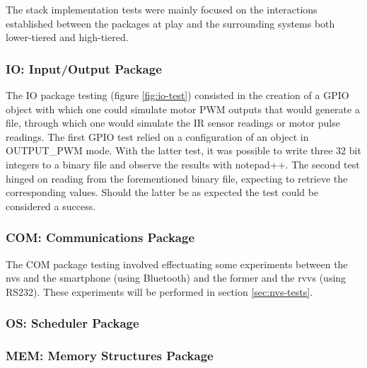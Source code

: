 %
The stack implementation tests were mainly focused on the interactions established between the packages at play and the surrounding systems both lower-tiered and high-tiered.
%
\subsubsection{IO: Input/Output Package}
%
The IO package testing (figure \ref{fig:io-test}) consisted in the creation of a GPIO object with which one could simulate motor PWM outputs that would generate a file, through which one would simulate the IR sensor readings or motor pulse readings. The first GPIO test relied on a configuration of an object in OUTPUT\_PWM mode. With the latter test, it was possible to write three 32 bit integers to a binary file and observe the results with notepad++.
The second test hinged on reading from the forementioned binary file, expecting to retrieve the corresponding values. Should the latter be as expected the test could be considered a success.
%
\subsubsection{COM: Communications Package}
%
The COM package testing involved effectuating some experiments between the \gls{nvs} and the smartphone (using Bluetooth) and the former and the \gls{rvvs} (using RS232). These experiments will be performed in section \ref{sec:nvs-tests}.
%
\subsubsection{OS: Scheduler Package}
%
\subsubsection{MEM: Memory Structures Package}
%
